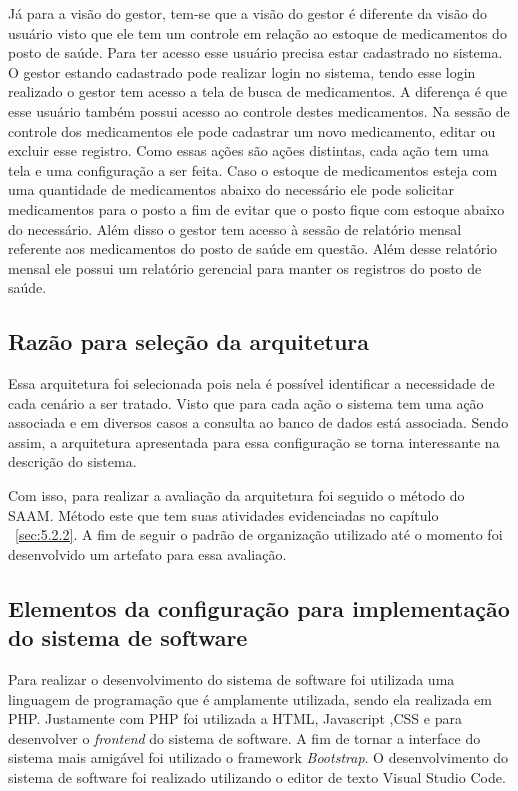 Já para a visão do gestor, tem-se que a visão do gestor é diferente da visão do usuário visto que ele tem um controle em relação ao estoque de medicamentos do posto de saúde. Para ter acesso esse usuário precisa estar cadastrado no sistema. O gestor estando cadastrado pode realizar login no sistema, tendo esse login realizado o gestor tem acesso a tela de busca de medicamentos. A diferença é que esse usuário também possui acesso ao controle destes medicamentos.
Na sessão de controle dos medicamentos ele pode cadastrar um novo medicamento, editar ou excluir esse registro. Como essas ações são ações distintas, cada ação tem uma tela e uma configuração a ser feita.
Caso o estoque de medicamentos esteja com uma quantidade de medicamentos abaixo do necessário ele pode solicitar medicamentos para o posto a fim de evitar que o posto fique com estoque abaixo do necessário.
Além disso o gestor tem acesso à sessão de relatório mensal referente aos medicamentos do posto de saúde em questão.
Além desse relatório mensal ele possui um relatório gerencial para manter os registros do posto de saúde.

\subsection{Razão para seleção da arquitetura}

Essa arquitetura foi selecionada pois nela é possível identificar a necessidade de cada cenário a ser tratado. Visto que para cada ação o sistema tem uma ação associada e em diversos casos a consulta ao banco de dados está associada. Sendo assim, a arquitetura apresentada para essa configuração se torna interessante na descrição do sistema. 

Com isso, para realizar a avaliação da arquitetura foi seguido o método do \acrfull{SAAM}. Método este que tem suas atividades evidenciadas no capítulo ~\ref{sec:5.2.2}. A fim de seguir o padrão de organização utilizado até o momento foi desenvolvido um artefato para essa avaliação.

\subsection{Elementos da configuração para implementação do sistema de software}

Para realizar o desenvolvimento do sistema de software foi utilizada uma linguagem de programação que é amplamente utilizada, sendo ela realizada em PHP. Justamente com PHP foi utilizada a \acrfull{HTML}, Javascript ,\acrfull{CSS} e para desenvolver o \emph{frontend} do sistema de software. A fim de tornar a interface do sistema mais amigável foi utilizado o framework \emph{Bootstrap}. O desenvolvimento do sistema de software foi realizado utilizando o editor de texto Visual Studio Code.

